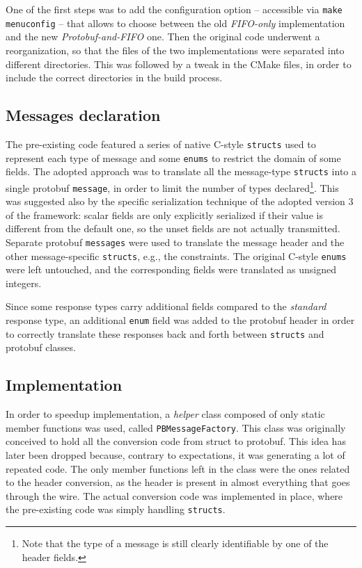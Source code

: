 One of the first steps was to add the configuration option -- accessible via \texttt{make menuconfig} -- that allows to choose between the old \emph{FIFO-only} implementation and the new \emph{Protobuf-and-FIFO} one. Then the original code underwent a reorganization, so that the files of the two implementations were separated into different directories. This was followed by a tweak in the CMake files, in order to include the correct directories in the build process.

\subsection{Messages declaration}
\label{sec:messages-declaration}

The pre-existing code featured a series of native C-style \texttt{structs} used to represent each type of message and some \texttt{enums} to restrict the domain of some fields. The adopted approach was to translate all the message-type \texttt{structs} into a single protobuf \texttt{message}, in order to limit the number of types declared\footnote{Note that the type of a message is still clearly identifiable by one of the header fields.}. This was suggested also by the specific serialization technique of the adopted version 3 of the framework: scalar fields are only explicitly serialized if their value is different from the default one, so the unset fields are not actually transmitted. Separate protobuf \texttt{messages} were used to translate the message header and the other message-specific \texttt{structs}, e.g.,  the constraints. The original C-style \texttt{enums} were left untouched, and the corresponding fields were translated as unsigned integers.

Since some response types carry additional fields compared to the \emph{standard} response type, an additional \texttt{enum} field was added to the protobuf header in order to correctly translate these responses back and forth between \texttt{structs} and protobuf classes.

\subsection{Implementation}

In order to speedup implementation, a \emph{helper} class composed of only static member functions was used, called \texttt{PBMessageFactory}. This class was originally conceived to hold all the conversion code from struct to protobuf. This idea has later been dropped because, contrary to expectations, it was generating a lot of repeated code. The only member functions left in the class were the ones related to the header conversion, as the header is present in almost everything that goes through the wire. The actual conversion code was implemented in place, where the pre-existing code was simply handling \texttt{structs}.

